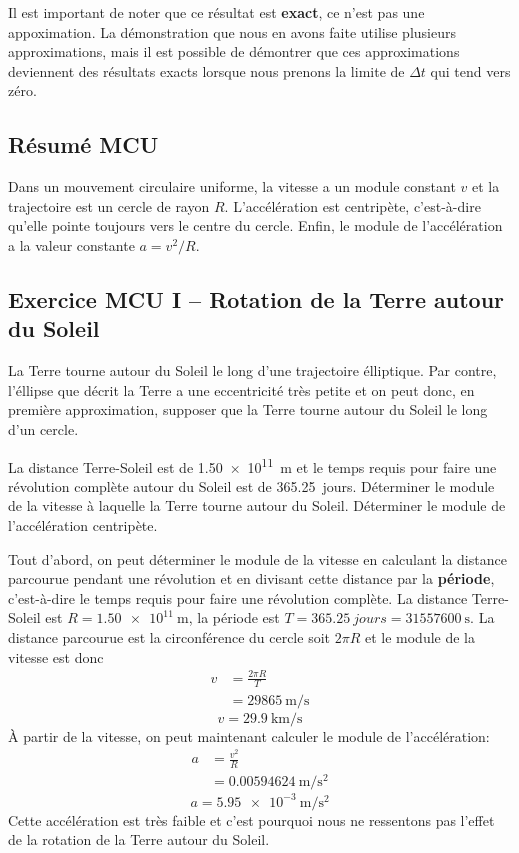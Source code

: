 Il est important de noter que ce résultat est \textbf{exact}, ce n'est pas une
appoximation.  La démonstration que nous en avons faite utilise plusieurs
approximations, mais il est possible de démontrer que ces approximations
deviennent des résultats exacts lorsque nous prenons la limite de $\Delta t$
qui tend vers zéro.


\subsection{Résumé MCU}

Dans un mouvement circulaire uniforme, la vitesse a un module constant $v$ et
la trajectoire est un cercle de rayon $R$.  L'accélération est centripète,
c'est-à-dire qu'elle pointe toujours vers le centre du cercle.  Enfin, le
module de l'accélération a la valeur constante $a = v^2/R$.


\subsection{Exercice MCU I -- Rotation de la Terre autour du Soleil}

La Terre tourne autour du Soleil le long d'une trajectoire élliptique.  Par
contre, l'éllipse que décrit la Terre a une eccentricité très petite et on peut
donc, en première approximation, supposer que la Terre tourne autour du Soleil
le long d'un cercle.

La distance Terre-Soleil est de \SI{1.50e11}{\meter} et le temps requis pour
faire une révolution complète autour du Soleil est de \SI{365.25}{jours}.
Déterminer le module de la vitesse à laquelle la Terre tourne autour du Soleil.
Déterminer le module de l'accélération centripète.


Tout d'abord, on peut déterminer le module de la vitesse en calculant la
distance parcourue pendant une révolution et en divisant cette distance par la
\textbf{période}, c'est-à-dire le temps requis pour faire une révolution
complète.  La distance Terre-Soleil est $R = \SI{1.50e11}{\meter}$, la période
est $T = \SI{365.25}{jours} = \SI{31557600}{\second}$.  La distance parcourue
est la circonférence du cercle soit $2 \pi R$ et le module de la vitesse est
donc
\begin{align*}
  v &= \frac{2\pi R}{T} \\
    &= \SI{29865}{\meter\per\second}
\end{align*}
\[
  \boxed{v = \SI{29.9}{\kilo\meter\per\second}}
\]
À partir de la vitesse, on peut maintenant calculer le module de
l'accélération:
\begin{align*}
  a &= \frac{v^2}{R} \\
    &= \SI{0.00594624}{\meter\per\second\squared}
\end{align*}
\[
  \boxed{a = \SI{5.95e-3}{\meter\per\second\squared}}
\]
Cette accélération est très faible et c'est pourquoi nous ne ressentons pas
l'effet de la rotation de la Terre autour du Soleil.


